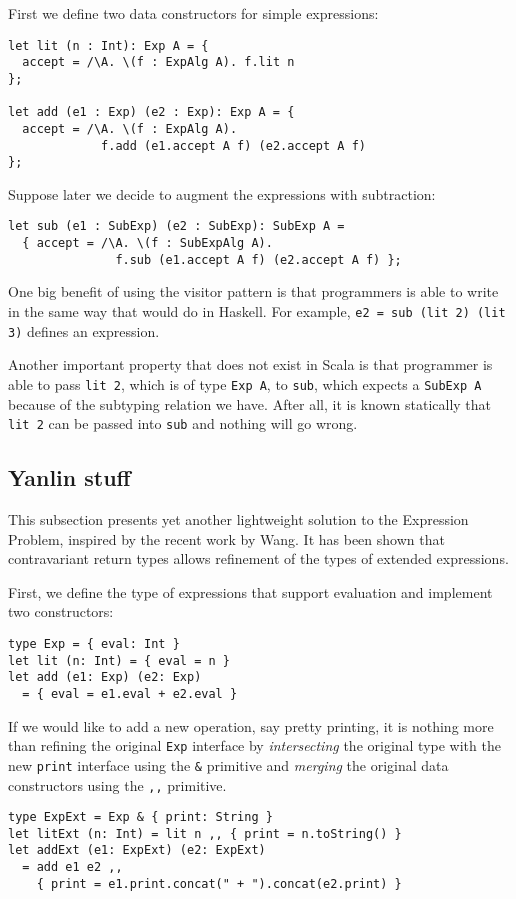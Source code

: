 First we define two data constructors for simple expressions:
\begin{lstlisting}
let lit (n : Int): Exp A = {
  accept = /\A. \(f : ExpAlg A). f.lit n
};

let add (e1 : Exp) (e2 : Exp): Exp A = {
  accept = /\A. \(f : ExpAlg A).
             f.add (e1.accept A f) (e2.accept A f)
};
\end{lstlisting}

Suppose later we decide to augment the expressions with subtraction:
\begin{lstlisting}
let sub (e1 : SubExp) (e2 : SubExp): SubExp A =
  { accept = /\A. \(f : SubExpAlg A).
               f.sub (e1.accept A f) (e2.accept A f) };
\end{lstlisting}

One big benefit of using the visitor pattern is that programmers is able to
write in the same way that would do in Haskell.
For example, \lstinline{e2 = sub (lit 2) (lit 3)} defines an expression.

Another important property that does not exist in Scala is that programmer is
able to pass \lstinline{lit 2}, which is of type \lstinline{Exp A}, to
\lstinline{sub}, which expects a \lstinline{SubExp A} because of the subtyping
relation we have. After all, it is known statically that \lstinline{lit 2} can
be passed into \lstinline{sub} and nothing will go
wrong.

\subsection{Yanlin stuff}

This subsection presents yet another lightweight solution to the Expression
Problem, inspired by the recent work by Wang. It has been shown that
contravariant return types allows refinement of the types of extended
expressions.

First, we define the type of expressions that support evaluation and implement
two constructors:
\begin{lstlisting}
type Exp = { eval: Int }
let lit (n: Int) = { eval = n }
let add (e1: Exp) (e2: Exp)
  = { eval = e1.eval + e2.eval }
\end{lstlisting}

If we would like to add a new operation, say pretty printing, it is nothing more
than refining the original \lstinline{Exp} interface by \emph{intersecting} the
original type with the new \lstinline{print} interface using the \lstinline{&}
primitive and \emph{merging} the original data constructors using the \lstinline{,,}
primitive.
\begin{lstlisting}
type ExpExt = Exp & { print: String }
let litExt (n: Int) = lit n ,, { print = n.toString() }
let addExt (e1: ExpExt) (e2: ExpExt)
  = add e1 e2 ,,
    { print = e1.print.concat(" + ").concat(e2.print) }
\end{lstlisting}

